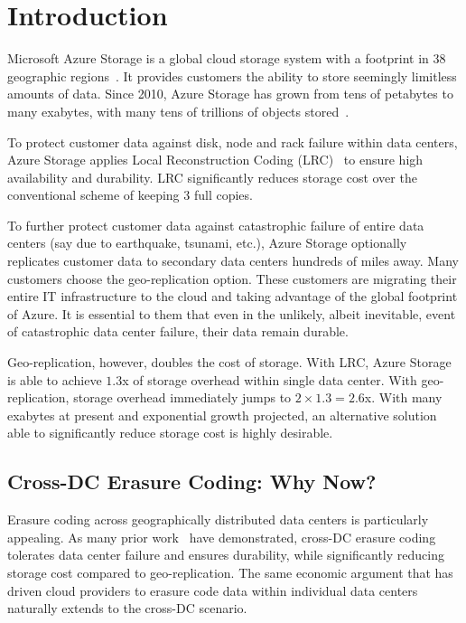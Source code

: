 \section{Introduction}

Microsoft Azure Storage is a global cloud storage system with a footprint in 38 geographic regions~\cite{bib:azureregions}. It provides customers the ability to store seemingly limitless amounts of data. Since 2010, Azure Storage has grown from tens of petabytes to many exabytes, with many tens of trillions of objects stored~\cite{greenberg2015sdn}.


To protect customer data against disk, node and rack failure within data centers, Azure Storage applies Local Reconstruction Coding (LRC)~\cite{huang2012erasure} to ensure high availability and durability. LRC significantly reduces storage cost over the conventional scheme of keeping 3 full copies.

To further protect customer data against catastrophic failure of entire data centers (say due to earthquake, tsunami, etc.), Azure Storage optionally replicates customer data to secondary data centers hundreds of miles away. Many customers choose the geo-replication option. These customers are migrating their entire IT infrastructure to the cloud and taking advantage of the global footprint of Azure. It is essential to them that even in the unlikely, albeit inevitable, event of catastrophic data center failure, their data remain durable.

Geo-replication, however, doubles the cost of storage. With LRC, Azure Storage is able to achieve $1.3$x of storage overhead within single data center. With geo-replication, storage overhead immediately jumps to $2 \times 1.3 = 2.6$x. With many exabytes at present and exponential growth projected, an alternative solution able to significantly reduce storage cost is highly desirable.

\subsection{Cross-DC Erasure Coding: Why Now?}

Erasure coding across geographically distributed data centers is particularly appealing. As many prior work~\cite{oceanstore:asplos00, pond:fast03, weatherspoon2005long, hail:ccs09, racs:socc10, hu12nccloud} have demonstrated, cross-DC erasure coding tolerates data center failure and ensures durability, while significantly reducing storage cost compared to geo-replication. The same economic argument that has driven cloud providers to erasure code data within individual data centers naturally extends to the cross-DC scenario.

